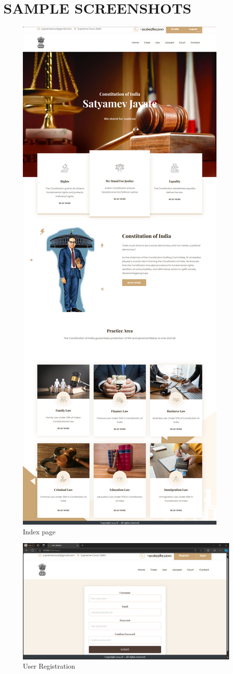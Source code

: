 %
\chapter{SAMPLE SCREENSHOTS}
\begin{figure}
  \centering
  \includegraphics[width=0.5\linewidth]{indexpage.png}
 \caption{Index page}
   \label{fig:Index page}
\end{figure}

\begin{figure}
  \centering
  \includegraphics[width=0.5\linewidth]{registration.png}
 \caption{User Registration}
   \label{fig:User Registration}
\end{figure}

